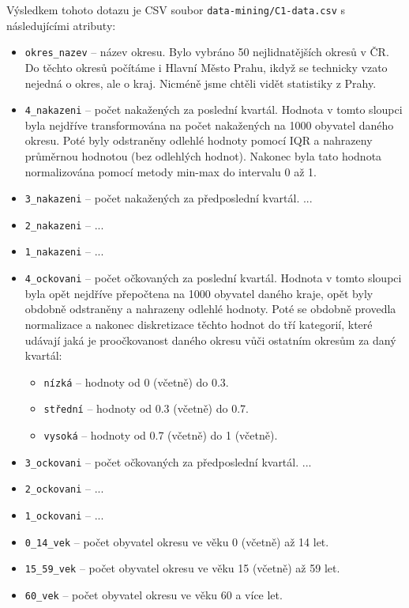 \documentclass[12pt]{article}
\begin{document}
Výsledkem tohoto dotazu je CSV soubor \texttt{data-mining/C1-data.csv} s následujícími atributy:
        \begin{itemize}
            \item \texttt{okres\_nazev} -- název okresu. Bylo vybráno 50 nejlidnatějších okresů v ČR. Do těchto okresů počítáme i Hlavní Město Prahu, ikdyž se technicky vzato nejedná o okres, ale o kraj. Nicméně jsme chtěli vidět statistiky z Prahy.
            \item \texttt{4\_nakazeni} -- počet nakažených za poslední kvartál. Hodnota v tomto sloupci byla nejdříve transformována na počet nakažených na 1000 obyvatel daného okresu. Poté byly odstraněny odlehlé hodnoty pomocí IQR a nahrazeny průměrnou hodnotou (bez odlehlých hodnot). Nakonec byla tato hodnota normalizována pomocí metody min-max do intervalu 0 až 1.
            \item \texttt{3\_nakazeni} -- počet nakažených za předposlední kvartál. ...
            \item \texttt{2\_nakazeni} -- ...
            \item \texttt{1\_nakazeni} -- ...
            \item \texttt{4\_ockovani} -- počet očkovaných za poslední kvartál. Hodnota v tomto sloupci byla opět nejdříve přepočtena na 1000 obyvatel daného kraje, opět byly obdobně odstraněny a nahrazeny odlehlé hodnoty. Poté se obdobně provedla normalizace a nakonec diskretizace těchto hodnot do tří kategorií, které udávají jaká je proočkovanost daného okresu vůči ostatním okresům za daný kvartál:
                \begin{itemize}
                    \item \texttt{nízká} -- hodnoty od 0 (včetně) do 0.3.
                    \item \texttt{střední} -- hodnoty od 0.3 (včetně) do 0.7.
                    \item \texttt{vysoká} -- hodnoty od 0.7 (včetně) do 1 (včetně).
                \end{itemize}
            \item \texttt{3\_ockovani} -- počet očkovaných za předposlední kvartál. ...
            \item \texttt{2\_ockovani} -- ...
            \item \texttt{1\_ockovani} -- ...
            \item \texttt{0\_14\_vek} -- počet obyvatel okresu ve věku 0 (včetně) až 14 let.
            \item \texttt{15\_59\_vek} -- počet obyvatel okresu ve věku 15 (včetně) až 59 let.
            \item \texttt{60\_vek} -- počet obyvatel okresu ve věku 60 a více let.
        \end{itemize}
        
\end{document}

